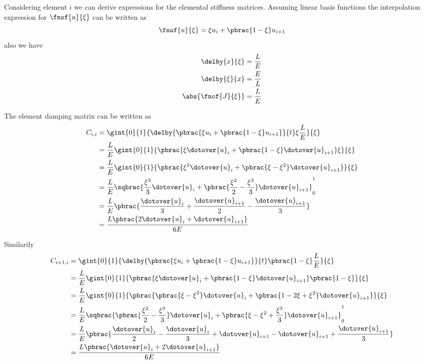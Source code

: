 Considering element $i$ we can derive expressions for the elemental
stiffness matrices. Assuming linear basis functions the interpolation
expression for $\fnof{u}{\xi}$ can be written as
\begin{equation}
  \fnof{u}{\xi}=\xi u_{i}+\pbrac{1-\xi}u_{i+1}
\end{equation}
also we have
\begin{align}
  \delby{x}{\xi}&=\dfrac{L}{E} \\
  \delby{\xi}{x}&=\dfrac{E}{L} \\
  \abs{\fnof{J}{\xi}}&=\dfrac{L}{E}
\end{align}

The element damping matrix can be written as
\begin{align}
  C_{i,i}&=\gint{0}{1}{\delby{\pbrac{\xi u_{i}+\pbrac{1-\xi}u_{i+1}}}{t}\xi\dfrac{L}{E}}{\xi} \\
  &=\dfrac{L}{E}\gint{0}{1}{\pbrac{\xi\dotover{u}_{i}+\pbrac{1-\xi}\dotover{u}_{i+1}}\xi}{\xi} \\
  &=\dfrac{L}{E}\gint{0}{1}{\pbrac{\xi^{2}\dotover{u}_{i}+\pbrac{\xi-\xi^{2}}\dotover{u}_{i+1}}}{\xi} \\
  &=\dfrac{L}{E}\sqbrac{\dfrac{\xi^{3}}{3}\dotover{u}_{i}+\pbrac{\dfrac{\xi^{2}}{2}-\dfrac{\xi^{3}}{3}}\dotover{u}_{i+1}}_{0}^{1}\\
  &=\dfrac{L}{E}\pbrac{\dfrac{\dotover{u}_{i}}{3}+\dfrac{\dotover{u}_{i+1}}{2}-\dfrac{\dotover{u}_{i+1}}{3}}\\
  &=\dfrac{L\pbrac{2\dotover{u}_{i}+\dotover{u}_{i+1}}}{6E}  
\end{align}

Similarily
\begin{align}
  C_{i+1,i}&=\gint{0}{1}{\delby{\pbrac{\xi u_{i}+\pbrac{1-\xi}u_{i+1}}}{t}\pbrac{1-\xi}\dfrac{L}{E}}{\xi} \\
  &=\dfrac{L}{E}\gint{0}{1}{\pbrac{\xi\dotover{u}_{i}+\pbrac{1-\xi}\dotover{u}_{i+1}}\pbrac{1-\xi}}{\xi} \\
  &=\dfrac{L}{E}\gint{0}{1}{\pbrac{\pbrac{\xi-\xi^{2}}\dotover{u}_{i}+\pbrac{1-2\xi+\xi^{2}}\dotover{u}_{i+1}}}{\xi} \\
  &=\dfrac{L}{E}\sqbrac{\pbrac{\dfrac{\xi^{2}}{2}-\dfrac{\xi^{3}}{3}}\dotover{u}_{i}+\pbrac{\xi-\xi^{2}+
      \dfrac{\xi^{3}}{3}}\dotover{u}_{i+1}}_{0}^{1}\\
  &=\dfrac{L}{E}\pbrac{\dfrac{\dotover{u}_{i}}{2}-\dfrac{\dotover{u}_{i}}{3}+\dotover{u}_{i+1}-\dotover{u}_{i+1}+
    \dfrac{\dotover{u}_{i+1}}{3}}\\
  &=\dfrac{L\pbrac{\dotover{u}_{i}+2\dotover{u}_{i+1}}}{6E}  
\end{align}

